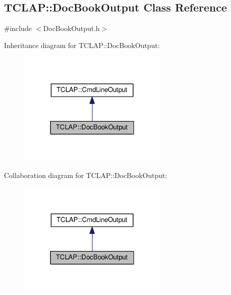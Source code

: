 \hypertarget{classTCLAP_1_1DocBookOutput}{}\subsection{T\+C\+L\+AP\+:\+:Doc\+Book\+Output Class Reference}
\label{classTCLAP_1_1DocBookOutput}


{\ttfamily \#include $<$Doc\+Book\+Output.\+h$>$}



Inheritance diagram for T\+C\+L\+AP\+:\+:Doc\+Book\+Output\+:
\nopagebreak
\begin{figure}[H]
\begin{center}
\leavevmode
\includegraphics[width=205pt]{classTCLAP_1_1DocBookOutput__inherit__graph}
\end{center}
\end{figure}


Collaboration diagram for T\+C\+L\+AP\+:\+:Doc\+Book\+Output\+:
\nopagebreak
\begin{figure}[H]
\begin{center}
\leavevmode
\includegraphics[width=205pt]{classTCLAP_1_1DocBookOutput__coll__graph}
\end{center}
\end{figure}
